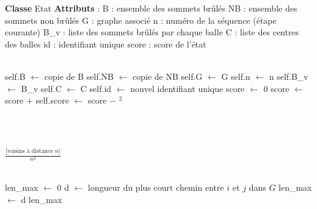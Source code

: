 \documentclass[11pt,a4paper]{article}
\begin{document}
\begin{tcolorbox}[title=Structure de la classe Etat,colback=red!10!white,colframe=red!95!black]
\begin{algorithm}[H]
\begin{algorithmic}[1]
    \State \textbf{Classe} Etat
    \State \textbf{Attributs} :
    \State \hspace{1em} B : ensemble des sommets brûlés
    \State \hspace{1em} NB : ensemble des sommets non brûlés
    \State \hspace{1em} G : graphe associé
    \State \hspace{1em} n : numéro de la séquence (étape courante)
    \State \hspace{1em} B\_v : liste des sommets brûlés par chaque balle
    \State \hspace{1em} C : liste des centres des balles
    \State \hspace{1em} id : identifiant unique
    \State \hspace{1em} score : score de l'état

    \\

        \State self.B $\gets$ copie de B
        \State self.NB $\gets$ copie de NB
        \State self.G $\gets$ G
        \State self.n $\gets$ n
        \State self.B\_v $\gets$ B\_v
        \State self.C $\gets$ C
        \State self.id $\gets$ nouvel identifiant unique
        \State score $\gets$ 0
        \For{chaque $i$ dans $[0, |B\_v|)$}
            \State score $\gets$ score $+$ 
        \EndFor
        \State self.score $\gets$ score $-$ $^2$
    \EndProcedure

    \\
    \\

            \State {}

        \Else
            \State \Return $\frac{|\text{voisins à distance } n|}{n^2}$
        \EndIf
    \EndFunction

    \\

        \State len\_max $\gets$ 0
                \State d $\gets$ longueur du plus court chemin entre $i$ et $j$ dans $G$
                    \State len\_max $\gets$ d
                \EndIf
            \EndFor
        \EndFor
        \State \Return len\_max
    \EndFunction



\end{algorithmic}
\end{algorithm}

\end{tcolorbox}
\end{document}
